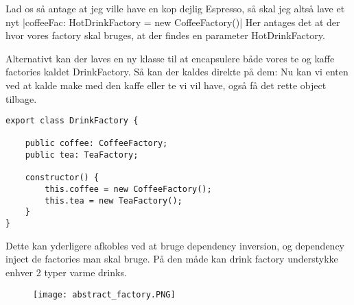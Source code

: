 \documentclass[../SWD_disp.tex]{subfiles}
\begin{document}
Lad os så antage at jeg ville have en kop dejlig Espresso, så skal jeg altså lave et nyt 
|coffeeFac: HotDrinkFactory = new CoffeeFactory()|
Her antages det at der hvor vores factory skal bruges, at der findes en parameter HotDrinkFactory. 

Alternativt kan der laves en ny klasse til at encapsulere både vores te og kaffe factories kaldet DrinkFactory. Så kan der kaldes direkte på dem: 
Nu kan vi enten ved at kalde make med den kaffe eller te vi vil have, også få det rette object tilbage.

\begin{verbatim}
export class DrinkFactory {

    public coffee: CoffeeFactory;
    public tea: TeaFactory;

    constructor() {
        this.coffee = new CoffeeFactory();
        this.tea = new TeaFactory();
    }
}
\end{verbatim}

Dette kan yderligere afkobles ved at bruge dependency inversion, og dependency inject de factories man skal bruge. På den måde kan drink factory understykke enhver 2 typer varme drinks. 

\begin{figure}[H]
    \centering
    \texttt{[image: abstract\_factory.PNG]}
\end{figure}
\end{document}

